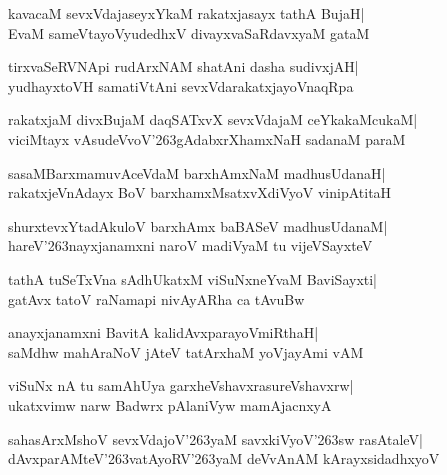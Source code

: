 \documentclass[twoside,12pt,openright]{book}
\def\S{\char'263}
\newcounter{shloka}[chapter]
\begin{document}
\begin{shloka}%
kavacaM sevxVdajaseyxYkaM rakatxjasayx tathA BujaH|\\
EvaM sameVtayoVyudedhxV divayxvaSaRdavxyaM gataM
\end{shloka}

\begin{shloka}%
tirxvaSeRVNApi rudArxNAM shatAni dasha sudivxjAH|\\
yudhayxtoVH samatiVtAni sevxVdarakatxjayoVnaqRpa
\end{shloka}

\begin{shloka}%
rakatxjaM divxBujaM daqSATxvX sevxVdajaM ceYkakaMcukaM|\\
viciMtayx vAsudeVvoV\S gAdabxrXhamxNaH sadanaM paraM
\end{shloka}

\begin{shloka}%
sasaMBarxmamuvAceVdaM barxhAmxNaM madhusUdanaH|\\
rakatxjeVnAdayx BoV barxhamxMsatxvXdiVyoV vinipAtitaH
\end{shloka}

\begin{shloka}%
shurxtevxYtadAkuloV barxhAmx baBASeV madhusUdanaM|\\
hareV\S nayxjanamxni naroV madiVyaM tu vijeVSayxteV
\end{shloka}

\begin{shloka}%
tathA tuSeTxVna sAdhUkatxM viSuNxneYvaM BaviSayxti|\\
gatAvx tatoV raNamapi nivAyARha ca tAvuBw
\end{shloka}

\begin{shloka}%
anayxjanamxni BavitA kalidAvxparayoVmiRthaH|\\
saMdhw mahAraNoV jAteV tatArxhaM yoVjayAmi vAM
\end{shloka}

\begin{shloka}%
viSuNx nA tu samAhUya garxheVshavxrasureVshavxrw|\\
ukatxvimw narw Badwrx pAlaniVyw mamAjacnxyA
\end{shloka}

\begin{shloka}%
sahasArxMshoV sevxVdajoV\S yaM savxkiVyoV\S sw rasAtaleV|\\
dAvxparAMteV\S vatAyoRV\S yaM deVvAnAM kArayxsidadhxyoV
\end{shloka}
\end{document}
